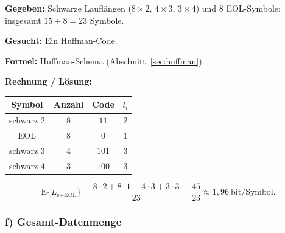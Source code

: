 \begin{beispiel}

\textbf{Gegeben:} Schwarze Lauflängen ($8\times 2$, $4\times 3$, $3\times 4$)
und $8$ EOL-Symbole; insgesamt $15 + 8 = 23$ Symbole.

\textbf{Gesucht:} Ein Huffman-Code.

\textbf{Formel:} Huffman-Schema (Abschnitt~\ref{sec:huffman}).

\textbf{Rechnung / Lösung:}

\begin{center}
\begin{tabular}{c|c|c|c}
Symbol & Anzahl & Code & $l_i$ \\ \hline
schwarz $2$ & $8$ & $11$   & $2$ \\
EOL         & $8$ & $0$    & $1$ \\
schwarz $3$ & $4$ & $101$  & $3$ \\
schwarz $4$ & $3$ & $100$  & $3$ \\
\end{tabular}
\end{center}

$$
\boxed{\;\mathrm{E}\{L_{\text{s+EOL}}\}
= \frac{8\cdot 2 + 8\cdot 1 + 4\cdot 3 + 3\cdot 3}{23}
= \frac{45}{23} \approx 1{,}96\ \text{bit/Symbol}.\;}
$$

\end{beispiel}

\subsubsection*{f) Gesamt-Datenmenge}

